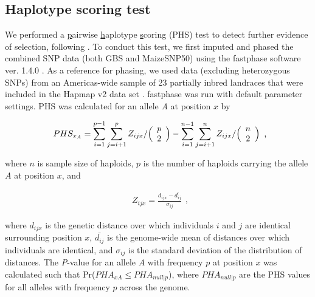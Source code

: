 \subsection*{Haplotype scoring test}
We performed a \underline{p}airwise \underline{h}aplotype \underline{s}coring (PHS) test to detect further evidence of selection, following \cite{Toomajian_2006_16623598}.  
To conduct this test, we first imputed and phased the combined SNP data (both GBS and MaizeSNP50) using the {\sf fastphase} software ver. 1.4.0 \cite[]{Scheet_2006_16532393}.  
As a reference for phasing, we used data (excluding heterozygous SNPs) from an Americas-wide sample of 23 partially inbred landraces that were included in the Hapmap v2 data set  \cite[]{Hufford_2012_22660546}.  
{\sf fastphase} was run with default parameter settings.  PHS was calculated for an allele \emph{A} at position $x$ by

\begin{equation}
  \label{phs-1}
  \begin{array}{l}
  \displaystyle{
PHS_{x_A} = \sum^{p-1}_{i=1}\sum^{p}_{j=i+1}Z_{ijx}  / \Bigl( \begin{array}{c} p \\ 2 \\ \end{array} \Bigr) 
- \sum^{n-1}_{i=1}\sum^{n}_{j=i+1}Z_{ijx}  / \Bigl( \begin{array}{c} n \\ 2 \\ \end{array} \Bigr) 
  }
  \end {array} 
  \textrm{,}
\end{equation}

\noindent where $n$ is sample size of haploids, $p$  is the number of haploids carrying the allele $A$ at position $x$, and

\begin{equation}
  \label{phs-2}
  \begin{array}{l}
  \displaystyle{
Z_{ijx} = \frac{ d_{ijx} - \bar{d_{ij}} }{ \sigma_{ij} }
  }
  \end {array} 
  \textrm{,}
\end{equation}

\noindent where $d_{ijx}$ is the genetic distance over which individuals $i$ and $j$ are identical surrounding position $x$, $\bar{d_{ij}}$ is the genome-wide mean of distances over which individuals are identical, and $\sigma_{ij}$ is the standard deviation of the distribution of distances.  
The \emph{P}-value for an allele $A$ with frequency $p$ at position $x$ was calculated such that Pr($PHA_{xA}\leq PHA_{null|p}$), where $PHA_{null|p}$ are the PHS values for all alleles with frequency $p$ across the genome. 

